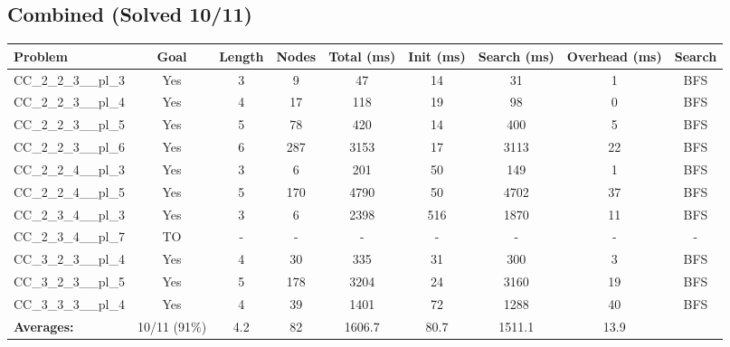\documentclass{article}
\begin{document}
\subsection*{Combined (Solved 10/11)}
\begin{tabular}{lcccccccc}
\toprule
Problem & Goal & Length & Nodes & Total (ms) & Init (ms) & Search (ms) & Overhead (ms) & Search \\
\midrule
CC\_2\_2\_3\_\_pl\_3 & Yes & 3 & 9 & 47 & 14 & 31 & 1 & BFS \\
CC\_2\_2\_3\_\_pl\_4 & Yes & 4 & 17 & 118 & 19 & 98 & 0 & BFS \\
CC\_2\_2\_3\_\_pl\_5 & Yes & 5 & 78 & 420 & 14 & 400 & 5 & BFS \\
CC\_2\_2\_3\_\_pl\_6 & Yes & 6 & 287 & 3153 & 17 & 3113 & 22 & BFS \\
CC\_2\_2\_4\_\_pl\_3 & Yes & 3 & 6 & 201 & 50 & 149 & 1 & BFS \\
CC\_2\_2\_4\_\_pl\_5 & Yes & 5 & 170 & 4790 & 50 & 4702 & 37 & BFS \\
CC\_2\_3\_4\_\_pl\_3 & Yes & 3 & 6 & 2398 & 516 & 1870 & 11 & BFS \\
CC\_2\_3\_4\_\_pl\_7 & TO & - & - & - & - & - & - & - \\
CC\_3\_2\_3\_\_pl\_4 & Yes & 4 & 30 & 335 & 31 & 300 & 3 & BFS \\
CC\_3\_2\_3\_\_pl\_5 & Yes & 5 & 178 & 3204 & 24 & 3160 & 19 & BFS \\
CC\_3\_3\_3\_\_pl\_4 & Yes & 4 & 39 & 1401 & 72 & 1288 & 40 & BFS \\
\textbf{Averages:} & 10/11 (91\%) & 4.2 & 82 & 1606.7 & 80.7 & 1511.1 & 13.9 & \\
\bottomrule
\end{tabular}
\\[0.7cm]
\end{document}
